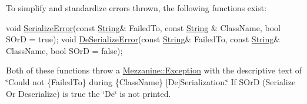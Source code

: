 To simplify and standardize errors thrown, the following functions exist\-: 
\begin{DoxyCode}
\textcolor{keywordtype}{void} \hyperlink{namespaceMezzanine_ab061665515c8e8a8b09ee54d93612da1}{SerializeError}(\textcolor{keyword}{const} \hyperlink{namespaceMezzanine_acf9fcc130e6ebf08e3d8491aebcf1c86}{String}& FailedTo, \textcolor{keyword}{const} \hyperlink{namespaceMezzanine_acf9fcc130e6ebf08e3d8491aebcf1c86}{String}
      & ClassName, \textcolor{keywordtype}{bool} SOrD = \textcolor{keyword}{true});
\textcolor{keywordtype}{void} \hyperlink{namespaceMezzanine_aec75a8a3369287cb02f331c62b32df73}{DeSerializeError}(\textcolor{keyword}{const} \hyperlink{namespaceMezzanine_acf9fcc130e6ebf08e3d8491aebcf1c86}{String}& FailedTo, \textcolor{keyword}{const} \hyperlink{namespaceMezzanine_acf9fcc130e6ebf08e3d8491aebcf1c86}{
      String}& ClassName, \textcolor{keywordtype}{bool} SOrD = \textcolor{keyword}{false});
\end{DoxyCode}
 Both of these functions throw a \hyperlink{classMezzanine_1_1Exception}{Mezzanine\-::\-Exception} with the descriptive text of \char`\"{}\-Could not \{\-Failed\-To\} during \{\-Class\-Name\} \mbox{[}\-De\mbox{]}\-Serialization.\char`\"{} If S\-Or\-D (Serialize Or Deserialize) is true the \char`\"{}\-De\char`\"{} is not printed. 